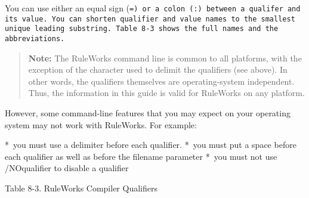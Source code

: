 You can use either an equal sign (\tt{=}) or a colon (\verb|:|)
between a qualifer and its value. You can shorten
qualifier and value names to the smallest unique leading
substring. Table 8-3 shows the full names and the
abbreviations.
\begin{quote}
\textbf{Note:} The RuleWorks command line is common to all
  platforms, with the exception of the character used to
  delimit the qualifiers (see above). In other words, the
  qualifiers themselves are operating-system independent.
  Thus, the information in this guide is valid for
  RuleWorks on any platform.
\end{quote}

  However, some command-line features that you may expect
  on your operating system may not work with RuleWorks.
  For example:

  * you must use a delimiter before each qualifier.
  * you must put a space before each qualifier as well as
    before the filename parameter
  * you must not use /NOqualifier to disable a qualifier

Table 8-3. RuleWorks Compiler Qualifiers


